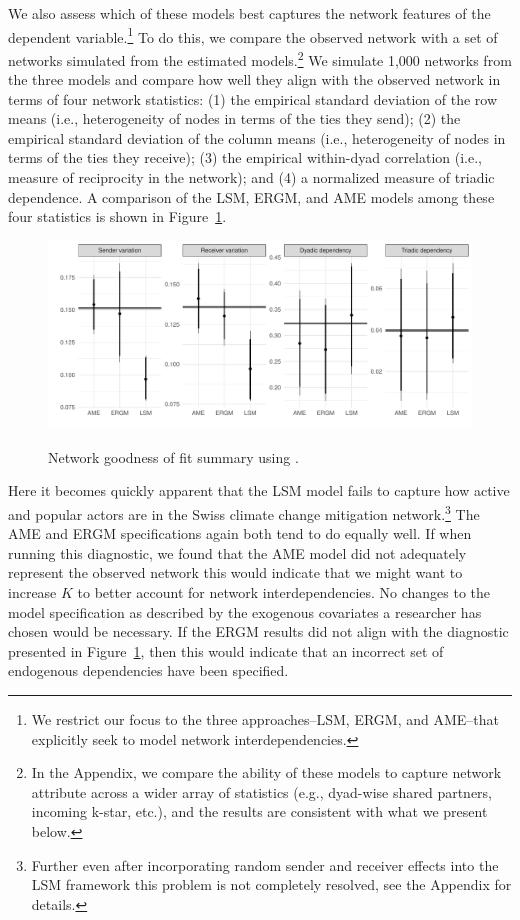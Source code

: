 We also assess which of these models best captures the network features of the dependent variable.\footnote{We restrict our focus to the three approaches--LSM, ERGM, and AME--that explicitly
seek to model network interdependencies.} To do this, we compare the observed network with a set of networks simulated from the estimated models.\footnote{In the Appendix, we compare the ability of these models to capture network attribute across a wider array of statistics (e.g., dyad-wise shared partners, incoming k-star, etc.), and the results are consistent with what we present below.} We simulate 1,000 networks from the three models and compare how well they align with the observed network in terms of four network statistics: (1) the empirical standard deviation of the row means (i.e., heterogeneity of nodes in terms of the ties they send); (2) the empirical standard deviation of the column means (i.e., heterogeneity of nodes in terms of the ties they receive); (3) the empirical within-dyad correlation (i.e., measure of reciprocity in the network); and (4) a normalized measure of triadic dependence. A comparison of the LSM, ERGM, and AME models among these four statistics is shown in Figure~\ref{fig:ergmAmePerf}.

\begin{figure}[ht]
	\centering
	\caption{Network goodness of fit summary using .}
	\includegraphics[width=1\textwidth]{Figure3_bw}
	\label{fig:ergmAmePerf}
\end{figure}
\FloatBarrier

Here it becomes quickly apparent that the LSM model fails to capture how active and popular actors are in the Swiss climate change mitigation network.\footnote{Further even after incorporating random sender and receiver effects into the LSM framework this problem is not completely resolved, see the Appendix for details.} The AME and ERGM specifications again both tend to do equally well. If when running this diagnostic, we found that the AME model did not adequately represent the observed network this would indicate that we might want to increase $K$ to better account for network interdependencies. No changes to the model specification as described by the exogenous covariates a researcher has chosen would be necessary. If the ERGM results did not align with the diagnostic presented in Figure~\ref{fig:ergmAmePerf}, then this would indicate that an incorrect set of endogenous dependencies have been specified. 
